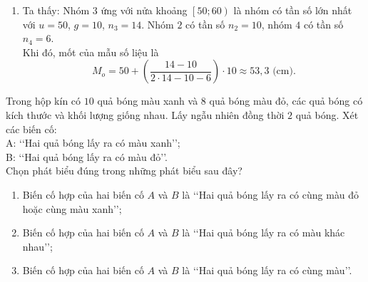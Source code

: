 \begin{bt}
{\begin{enumerate}
\begin{itemize}
				Khi đó, tứ phân vị thứ nhất là
				\[
				Q_1 = 40 + \dfrac{10 - 4}{10} \cdot 10 = 46\text{ (cm)}.
				\]
				\item Ta có $\dfrac{3n}{4} = 30$, mà $28 < 30 < 34$ nên nhóm $4$ là nhóm đầu tiên có tần số tích luỹ lớn hơn hoặc bằng $30$. \\
				Xét nhóm $4$ là nhóm $\left[60;70\right)$ có $t = 60$, $l = 10$, $n_4 = 6$ và nhóm $3$ có $cf_3 = 28$.\\
				Khi đó, tứ phân vị thứ ba là
				\[
				Q_3 = 60 + \dfrac{30 - 28}{6} \cdot 10 \approx 63{,}3\text{ (cm)}.
				\]
			\end{itemize}
			Vậy $55{,}5\text{ (cm)}$ là trung bình mẫu, $54{,}3\text{ (cm)}$ là trung vị của mẫu và $Q_1 = 46\text{ (cm)}$, $Q_2 = 54{,}3\text{ (cm)}$, $Q_3 = 63{,}3\text{ (cm)}$ là tứ phân vị của mẫu.
			\item Ta thấy: Nhóm $3$ ứng với nửa khoảng $\left[50;60\right)$ là nhóm có tần số lớn nhất với $u=50$, $g=10$, $n_3 = 14$. Nhóm $2$ có tần số $n_2 = 10$, nhóm $4$ có tần số $n_4 = 6$.\\
			Khi đó, mốt của mẫu số liệu là 
			\[
			M_o = 50 + \left( \dfrac{14 - 10}{2\cdot 14 - 10 - 6} \right) \cdot 10 \approx 53{,}3\text{ (cm)}.
			\]
		\end{enumerate}
	}
\end{bt}

\begin{bt}%
	Trong hộp kín có $10$ quả bóng màu xanh và $8$ quả bóng màu đỏ, các quả bóng có kích thước và khối lượng giống nhau. Lấy ngẫu nhiên đồng thời $2$ quả bóng. Xét các biến cố:\\
	A: \lq\lq Hai quả bóng lấy ra có màu xanh\rq\rq;\\
	B: \lq\lq Hai quả bóng lấy ra có màu đỏ\rq\rq.\\
	Chọn phát biểu đúng trong những phát biểu sau đây?
	\begin{enumerate}
		\item Biến cố hợp của hai biến cố $A$ và $B$ là \lq\lq Hai quả bóng lấy ra có cùng màu đỏ hoặc cùng màu xanh\rq\rq;
		\item Biến cố hợp của hai biến cố $A$ và $B$ là \lq\lq Hai quả bóng lấy ra có màu khác nhau\rq\rq;
		\item Biến cố hợp của hai biến cố $A$ và $B$ là \lq\lq Hai quả bóng lấy ra có cùng màu\rq\rq.
	\end{enumerate}
\end{bt}

